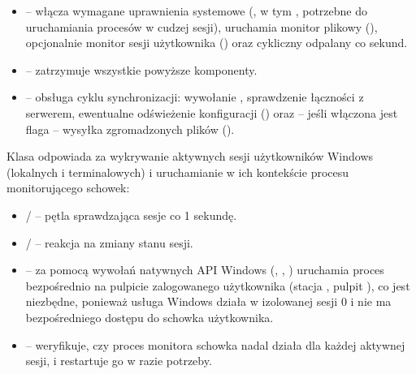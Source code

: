 \begin{itemize}[leftmargin=1.6em]
  \item {} -- włącza wymagane uprawnienia systemowe
        (, w tym ,
         potrzebne do uruchamiania procesów w cudzej sesji), uruchamia monitor
        plikowy (), opcjonalnie monitor sesji użytkownika
        () oraz cykliczny  odpalany co
         sekund.
  \item {} -- zatrzymuje wszystkie powyższe komponenty.
  \item {} -- obsługa cyklu synchronizacji: wywołanie
        , sprawdzenie łączności z serwerem, ewentualne odświeżenie
        konfiguracji () oraz -- jeśli włączona jest flaga
         -- wysyłka zgromadzonych plików ().
\end{itemize}


Klasa  odpowiada za wykrywanie aktywnych sesji użytkowników
Windows (lokalnych i terminalowych) i uruchamianie w ich kontekście procesu monitorującego schowek:

\begin{itemize}[leftmargin=1.6em]
  \item {}/ -- pętla sprawdzająca sesje co 1 sekundę.
  \item {}/ -- reakcja na zmiany stanu sesji.
  \item {} -- za pomocą wywołań natywnych API Windows
        (, , )
        uruchamia proces  bezpośrednio na pulpicie zalogowanego
        użytkownika (stacja , pulpit ), co jest niezbędne, ponieważ usługa
        Windows działa w izolowanej sesji 0 i nie ma bezpośredniego dostępu do schowka użytkownika.
  \item {} -- weryfikuje, czy proces monitora schowka nadal działa dla
        każdej aktywnej sesji, i restartuje go w razie potrzeby.
\end{itemize}

